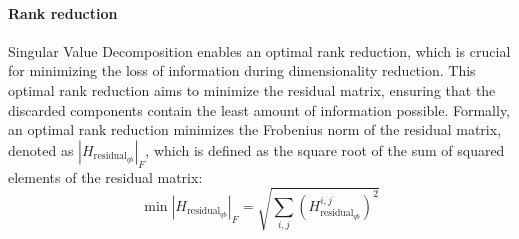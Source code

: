 \paragraph*{Rank reduction}
Singular Value Decomposition enables an optimal rank reduction, which is crucial for minimizing the loss of information during dimensionality reduction. 
This optimal rank reduction aims to minimize the residual matrix, ensuring that the discarded components contain the least amount of information possible.
Formally, an optimal rank reduction minimizes the Frobenius norm of the residual matrix, denoted as $\left\lvert H_{\text{residual}_{qb}} \right\rvert _F$, which is defined as the square root of the sum of squared elements of the residual matrix:
\[\min\left\lvert H_{\text{residual}_{qb}} \right\rvert _F=\sqrt{\sum_{i,j}\left(H_{\text{residual}_{qb}}^{i,j}\right)^2} \]